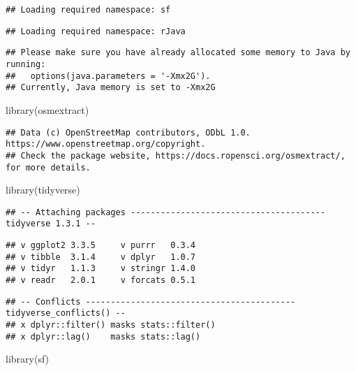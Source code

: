 \documentclass[
]{article}
\newenvironment{Shaded}{\begin{snugshade}}{\end{snugshade}}
\newcommand{\FunctionTok}[1]{\textcolor[rgb]{0.00,0.00,0.00}{#1}}
\newcommand{\NormalTok}[1]{#1}
\begin{document}
\begin{verbatim}
## Loading required namespace: sf
\end{verbatim}

\begin{verbatim}
## Loading required namespace: rJava
\end{verbatim}

\begin{verbatim}
## Please make sure you have already allocated some memory to Java by running:
##   options(java.parameters = '-Xmx2G').
## Currently, Java memory is set to -Xmx2G
\end{verbatim}

\begin{Shaded}
\begin{Highlighting}[]
\FunctionTok{library}\NormalTok{(osmextract)}
\end{Highlighting}
\end{Shaded}

\begin{verbatim}
## Data (c) OpenStreetMap contributors, ODbL 1.0. https://www.openstreetmap.org/copyright.
## Check the package website, https://docs.ropensci.org/osmextract/, for more details.
\end{verbatim}

\begin{Shaded}
\begin{Highlighting}[]
\FunctionTok{library}\NormalTok{(tidyverse)}
\end{Highlighting}
\end{Shaded}

\begin{verbatim}
## -- Attaching packages --------------------------------------- tidyverse 1.3.1 --
\end{verbatim}

\begin{verbatim}
## v ggplot2 3.3.5     v purrr   0.3.4
## v tibble  3.1.4     v dplyr   1.0.7
## v tidyr   1.1.3     v stringr 1.4.0
## v readr   2.0.1     v forcats 0.5.1
\end{verbatim}

\begin{verbatim}
## -- Conflicts ------------------------------------------ tidyverse_conflicts() --
## x dplyr::filter() masks stats::filter()
## x dplyr::lag()    masks stats::lag()
\end{verbatim}

\begin{Shaded}
\begin{Highlighting}[]
\FunctionTok{library}\NormalTok{(sf)}
\end{Highlighting}
\end{Shaded}
\end{document}
